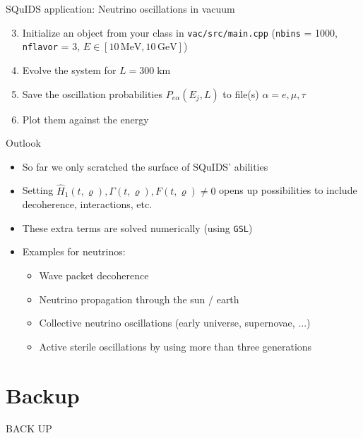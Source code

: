 \documentclass[]{beamer}
\newcommand{\backupbegin}{
	\newcounter{finalframe}
	\setcounter{finalframe}{\value{framenumber}}
}
\begin{document}
\begin{frame}{SQuIDS application: Neutrino oscillations in vacuum}
  \begin{enumerate}
    \setcounter{enumi}{2}
    \item Initialize an object from your class in \texttt{vac/src/main.cpp} (\texttt{nbins} = 1000, \texttt{nflavor} = 3, \(E \in [10 \,\mathrm{MeV}, 10 \,\mathrm{GeV}]\))
    \item Evolve the system for \(L = 300 \; \mathrm{km}\)
    \item Save the oscillation probabilities \(P_{e\alpha}(E_j, L)\) to file(s) \(\alpha = e, \mu, \tau\)
    \item Plot them against the energy
  \end{enumerate}
\end{frame}

\begin{frame}{Outlook}
  \begin{itemize}
    \item So far we only scratched the surface of SQuIDS' abilities
    \item Setting \(\hat{H}_1(t, \varrho), \Gamma(t, \varrho), F(t, \varrho) \neq 0\) opens up possibilities to include decoherence, interactions, etc.
    \item These extra terms are solved numerically (using \texttt{GSL})
    \item Examples for neutrinos:
    \begin{itemize}
      \item Wave packet decoherence 
      \item Neutrino propagation through the sun / earth 
      \item Collective neutrino oscillations (early universe, supernovae, ...)
      \item Active sterile oscillations by using more than three generations
    \end{itemize}
  \end{itemize}
\end{frame}

\appendix

\section{Backup}
\backupbegin

\begin{frame}
    \centering \Huge BACK UP
\end{frame}
\end{document}
